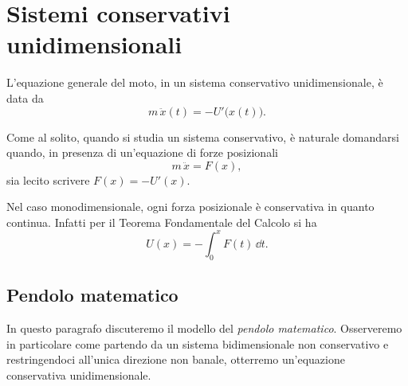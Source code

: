 %
%
\chapter{Sistemi conservativi unidimensionali}

L'equazione generale del moto, in un sistema conservativo unidimensionale, è data da
\[
	m\,\ddot{x}(t) = -U'\big(x(t)\big).
\]

\begin{oss}\label{oss:conservazioneUnidim}
	Come al solito, quando si studia un sistema conservativo, è naturale domandarsi quando, in presenza di un'equazione di forze posizionali
	\[
		m\,\ddot{x} = F(x),
	\]
	sia lecito scrivere \(F(x) = -U'(x)\).
	
	Nel caso monodimensionale, ogni forza posizionale è conservativa in quanto continua. Infatti per il Teorema Fondamentale del Calcolo si ha
	\[
		U(x) = -\int_0^x F(t)\,\dd t.
	\]
\end{oss}

\section{Pendolo matematico}

In questo paragrafo discuteremo il modello del \emph{pendolo matematico}.
Osserveremo in particolare come partendo da un sistema bidimensionale non conservativo e restringendoci all'unica direzione non banale, otterremo un'equazione conservativa unidimensionale.

